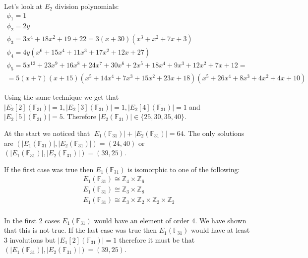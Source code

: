 \documentclass[12pt, a4paper]{article}
\begin{document}
Let's look at $E_2$ division polynomials:
\begin{gather*}
\phi_1= 1\\
\phi_2 = 2y\\
\phi_3 = 3x^4+18x^2+19+22 = 3(x+30)(x^3+x^2+7x+3)\\
\phi_4 = 4y(x^6+15x^4+11x^3+17x^2+12x+27)\\
\phi_5 = 5x^{12}+23x^9+16x^8+24x^7+30x^6+2x^5+18x^4+9x^3+12x^2+7x+12 = \\
=5(x+7)(x+15)(x^5+14x^4+7x^3+15x^2+23x+18)(x^5+26x^4+8x^3+4x^2+4x+10)
\end{gather*}

Using the same technique we get that $|E_2[2](\mathbb{F}_{31})|=1, |E_2[3](\mathbb{F}_{31})|=1, |E_2[4](\mathbb{F}_{31})|=1$ and $|E_2[5](\mathbb{F}_{31})|=5$. Therefore $|E_2(\mathbb{F}_{31})| \in \{25, 30, 35, 40\} $.

At the start we noticed that $|E_1(\mathbb{F}_{31})|+|E_2(\mathbb{F}_{31})|=64$. The only solutions are $(|E_1(\mathbb{F}_{31})|, |E_2(\mathbb{F}_{31})|) = (24, 40)$ or $(|E_1(\mathbb{F}_{31})|, |E_2(\mathbb{F}_{31})|) = (39, 25)$.

If the first case was true then $E_1(\mathbb{F}_{31})$ is isomorphic to one of the following:
\begin{gather*}
E_1(\mathbb{F}_{31}) \cong \mathbb{Z}_4 \times \mathbb{Z}_6\\
E_1(\mathbb{F}_{31}) \cong \mathbb{Z}_3 \times \mathbb{Z}_8\\
E_1(\mathbb{F}_{31}) \cong \mathbb{Z}_3 \times \mathbb{Z}_2 \times \mathbb{Z}_2 \times \mathbb{Z}_2\\
\end{gather*}

In the first 2 cases $E_1(\mathbb{F}_{31})$ would have an element of order 4. We have shown that this is not true. If the last case was true then $E_1(\mathbb{F}_{31})$ would have at least 3 involutions but $|E_1[2](\mathbb{F}_{31})|=1$ therefore it must be that $(|E_1(\mathbb{F}_{31})|, |E_2(\mathbb{F}_{31})|) = (39, 25)$.
\end{document}
